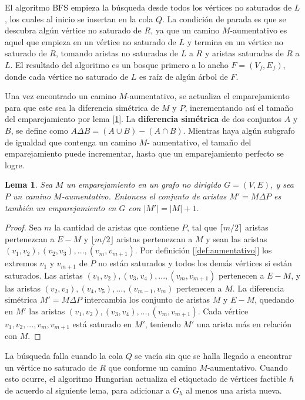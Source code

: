 \documentclass[10pt]{article} %
\newtheorem{lem}{Lema}
\begin{document}
	El algoritmo BFS empieza la b\'usqueda desde todos los v\'ertices no saturados de $L$, los cuales al inicio se insertan en la cola $Q$. La condici\'on de parada es que se descubra alg\'un v\'ertice no saturado de $R$, ya que un camino $M$-aumentativo es aquel que empieza en un v\'ertice no saturado de $L$ y termina en un v\'ertice no saturado de $R$, tomando aristas no saturadas de $L$ a $R$ y aristas saturadas de $R$ a $L$. El resultado del algoritmo es un bosque primero a lo ancho $F = (V_f, E_f)$, donde cada v\'ertice no saturado de $L$ es ra\'iz de alg\'un \'arbol de $F$.
	
	Una vez encontrado un camino $M$-aumentativo, se actualiza el emparejamiento para que este sea la diferencia sim\'etrica de $M$ y $P$, incrementando as\'i el tama\~no del emparejamiento por lema [\ref{lm:ds}]. La \textbf{diferencia sim\'etrica} de dos conjuntos $A$ y $B$, se define como $A \Delta B = (A \cup B) - (A \cap B)$. Mientras haya alg\'un subgrafo de igualdad que contenga un camino $M$- aumentativo, el tama\~no del emparejamiento puede incrementar, hasta que un emparejamiento perfecto se logre.
	
	\begin{lem}\cite{introduction}
		\label{lm:ds}
		Sea $M$ un emparejamiento en un grafo no dirigido $G=(V,E)$, y sea $P$ un camino $M$-aumentativo. Entonces el conjunto de aristas $M' = M \Delta P$ es tambi\'en un emparejamiento en $G$ con $|M'| = |M| + 1$.
	\end{lem}
	
	\begin{proof}
		Sea $m$ la cantidad de aristas que contiene $P$, tal que $\lceil m/2 \rceil$ aristas pertenezcan a $E-M$ y $\lfloor m/2 \rfloor$ aristas pertenezcan a $M$ y sean las aristas $(v_1,v_2),(v_2,v_3),...,(v_m,v_{m+1})$. Por definici\'on [\ref{def:aumentativo}] los extremos $v_1$ y $v_{m+1}$ de $P$  no est\'an saturados y todos los dem\'as v\'ertices si est\'an saturados. Las aristas $(v_1,v_2),(v_3,v_4),...,(v_m,v_{m+1})$ pertenecen a $E-M$, y las aristas $(v_2,v_3), (v_4,v_5),...,(v_{m-1},v_m)$ pertenecen a $M$. La diferencia sim\'etrica $M'=M \Delta P$ intercambia los conjunto de aristas $M$ y $E-M$, quedando en $M'$ las aristas $(v_1,v_2),(v_3,v_4),...,(v_m,v_{m+1})$. Cada v\'ertice $v_1,v_2,...,v_m,v_{m+1}$ est\'a saturado en $M'$, teniendo $M'$ una arista m\'as en relaci\'on con $M$.
	\end{proof}
	La b\'usqueda falla cuando  la cola $Q$ se vac\'ia sin que se halla llegado a encontrar un v\'ertice no saturado de $R$ que conforme un camino $M$-aumentativo. Cuando esto ocurre, el algoritmo Hungarian actualiza el etiquetado de v\'ertices factible $h$ de acuerdo al siguiente lema, para adicionar a $G_h$ al menos una arista nueva.
	
\end{document}
